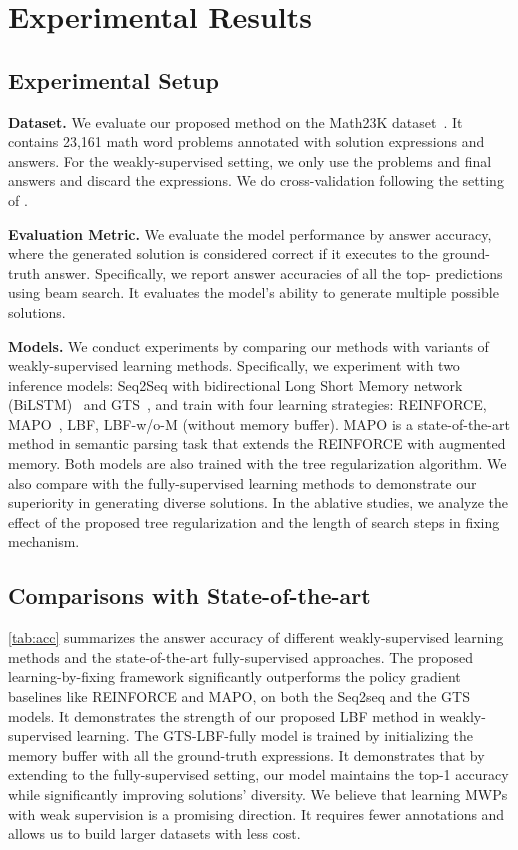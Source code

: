 \vspace{-7mm}
\section{Experimental Results} \label{sec:exp}
\subsection{Experimental Setup}
\noindent \textbf{Dataset.} We evaluate our proposed method on the Math23K dataset~\cite{wang-etal-2017-deep}. It contains 23,161 math word problems annotated with solution expressions and answers. For the weakly-supervised setting, we only use the problems and final answers and discard the expressions. We do cross-validation following the setting of \citet{Xie2019AGT}.




\noindent \textbf{Evaluation Metric.} We evaluate the model performance by answer accuracy, where the generated solution is considered correct if it executes to the ground-truth answer. Specifically, we report answer accuracies of all the top- predictions using beam search. It evaluates the model's ability to generate multiple possible solutions. 

\noindent \textbf{Models.} We conduct experiments by comparing our methods with variants of weakly-supervised learning methods. Specifically, we experiment with two inference models: Seq2Seq with bidirectional Long Short Memory network (BiLSTM)~\cite{Wu2016GooglesNM} and GTS~\cite{Xie2019AGT}, and train with four learning strategies: REINFORCE, MAPO~\cite{Liang2018MemoryAP}, LBF, LBF-w/o-M (without memory buffer). MAPO is a state-of-the-art method in semantic parsing task that extends the REINFORCE with augmented memory. Both models are also trained with the tree regularization algorithm. We also compare with the fully-supervised learning methods to demonstrate our superiority in generating diverse solutions. In the ablative studies, we analyze the effect of the proposed tree regularization and the length of search steps in fixing mechanism. 





\subsection{Comparisons with State-of-the-art}
\autoref{tab:acc} summarizes the answer accuracy of different weakly-supervised learning methods and the state-of-the-art fully-supervised approaches. The proposed learning-by-fixing framework significantly outperforms the policy gradient baselines like REINFORCE and MAPO, on both the Seq2seq and the GTS models. It demonstrates the strength of our proposed LBF method in weakly-supervised learning.  The GTS-LBF-fully model is trained by initializing the memory buffer with all the ground-truth expressions. It demonstrates that by extending to the fully-supervised setting, our model maintains the top-1 accuracy while significantly improving solutions' diversity. We believe that learning MWPs with weak supervision is a promising direction. It requires fewer annotations and allows us to build larger datasets with less cost.

